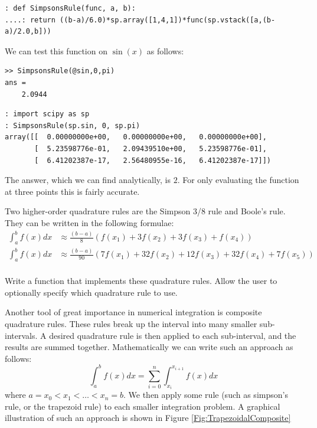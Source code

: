 \begin{python}
\begin{lstlisting}[style=python]
: def SimpsonsRule(func, a, b):
....: return ((b-a)/6.0)*sp.array([1,4,1])*func(sp.vstack([a,(b-a)/2.0,b]))
\end{lstlisting}
\end{python}


We can test this function on $\sin(x)$ as follows:
\begin{matlab}
\begin{lstlisting}[style=matlab]
>> SimpsonsRule(@sin,0,pi)
ans =
    2.0944
\end{lstlisting}
\end{matlab}

\begin{python}
\begin{lstlisting}[style=python]
: import scipy as sp
: SimpsonsRule(sp.sin, 0, sp.pi)
array([[  0.00000000e+00,   0.00000000e+00,   0.00000000e+00],
       [  5.23598776e-01,   2.09439510e+00,   5.23598776e-01],
       [  6.41202387e-17,   2.56480955e-16,   6.41202387e-17]])
\end{lstlisting}
\end{python}


The answer, which we can find analytically, is $2$. For only evaluating the function at three points this is fairly accurate.

\begin{problem}
Two higher-order quadrature rules are the Simpson 3/8 rule and Boole's rule. They can be written in the following formulae:
\begin{align*}
\int_a^b f(x) dx &\approx \frac{(b-a)}{8}\left(f(x_1) + 3 f(x_2) + 3 f(x_3) + f(x_4)\right) \\
\int_a^b f(x) dx &\approx \frac{(b-a)}{90}\left(7f(x_1) + 32 f(x_2) + 12 f(x_3) + 32f(x_4) + 7 f(x_5)\right) \\
\end{align*}

Write a function that implements these quadrature rules. Allow the user to optionally specify which quadrature rule to use.
\end{problem}

Another tool of great importance in numerical integration is composite quadrature rules. These rules break up the interval into many smaller sub-intervals. A desired quadrature rule is then applied to each sub-interval, and the results are summed together. Mathematically we can write such an approach as follows:
\[
\int_a^b f(x) dx = \sum_{i=0}^n \int_{x_i}^{x_{i+1}} f(x) dx
\]
where $a = x_0 < x_1 < \ldots < x_n = b$. We then apply some rule (such as simpson's rule, or the trapezoid rule) to each smaller integration problem. A graphical illustration of such an approach is shown in Figure \ref{Fig:TrapezoidalComposite}

